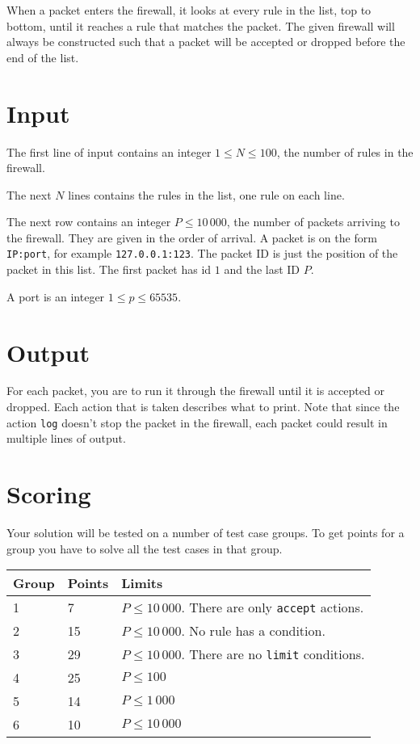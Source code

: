 When a packet enters the firewall, it looks at every rule in the list, top to bottom, until it reaches a rule that matches the packet. The given firewall will always be constructed such that a packet will be accepted or dropped before the end of the list.

\section*{Input}
The first line of input contains an integer $1 \le N \le 100$, the number of rules in the firewall.

The next $N$ lines contains the rules in the list, one rule on each line.

The next row contains an integer $P \le 10\,000$, the number of packets arriving to the firewall. They are given in the order of arrival.
A packet is on the form \texttt{IP:port}, for example \texttt{127.0.0.1:123}. The packet ID is just the position of the packet in this list. The first packet has id $1$ and the last ID $P$.

A port is an integer $1 \le p \le 65535$.

\section*{Output}
For each packet, you are to run it through the firewall until it is accepted or dropped. Each action that is taken describes what to print. Note that since the
action \texttt{log} doesn't stop the packet in the firewall, each packet could result in multiple lines of output.


\section*{Scoring}
Your solution will be tested on a number of test case groups. To get points for a group
you have to solve all the test cases in that group.

\begin{tabular}{| l | l | l |}
	\hline
	Group & Points & Limits\\ \hline
	1     & 7          & $P \le 10\,000$. There are only \texttt{accept} actions.  \\ \hline
	2     & 15         & $P \le 10\,000$. No rule has a condition. \\ \hline
	3     & 29         & $P \le 10\,000$. There are no \texttt{limit} conditions. \\ \hline
	4     & 25         & $P \le 100$ \\ \hline
	5     & 14         & $P \le 1\,000$ \\ \hline
	6     & 10         & $P \le 10\,000$ \\ \hline
\end{tabular}
